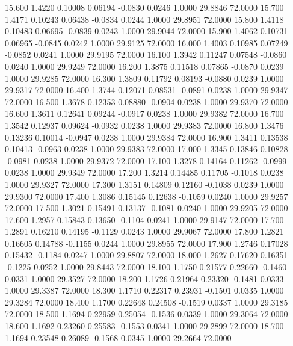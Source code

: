   15.600   1.4220   0.10008   0.06194  -0.0830   0.0246   1.0000  29.8846  72.0000
  15.700   1.4171   0.10243   0.06438  -0.0834   0.0244   1.0000  29.8951  72.0000
  15.800   1.4118   0.10483   0.06695  -0.0839   0.0243   1.0000  29.9044  72.0000
  15.900   1.4062   0.10731   0.06965  -0.0845   0.0242   1.0000  29.9125  72.0000
  16.000   1.4003   0.10985   0.07249  -0.0852   0.0241   1.0000  29.9195  72.0000
  16.100   1.3942   0.11247   0.07548  -0.0860   0.0240   1.0000  29.9249  72.0000
  16.200   1.3875   0.11518   0.07865  -0.0870   0.0239   1.0000  29.9285  72.0000
  16.300   1.3809   0.11792   0.08193  -0.0880   0.0239   1.0000  29.9317  72.0000
  16.400   1.3744   0.12071   0.08531  -0.0891   0.0238   1.0000  29.9347  72.0000
  16.500   1.3678   0.12353   0.08880  -0.0904   0.0238   1.0000  29.9370  72.0000
  16.600   1.3611   0.12641   0.09244  -0.0917   0.0238   1.0000  29.9382  72.0000
  16.700   1.3542   0.12937   0.09624  -0.0932   0.0238   1.0000  29.9383  72.0000
  16.800   1.3476   0.13236   0.10014  -0.0947   0.0238   1.0000  29.9384  72.0000
  16.900   1.3411   0.13538   0.10413  -0.0963   0.0238   1.0000  29.9383  72.0000
  17.000   1.3345   0.13846   0.10828  -0.0981   0.0238   1.0000  29.9372  72.0000
  17.100   1.3278   0.14164   0.11262  -0.0999   0.0238   1.0000  29.9349  72.0000
  17.200   1.3214   0.14485   0.11705  -0.1018   0.0238   1.0000  29.9327  72.0000
  17.300   1.3151   0.14809   0.12160  -0.1038   0.0239   1.0000  29.9300  72.0000
  17.400   1.3086   0.15145   0.12638  -0.1059   0.0240   1.0000  29.9257  72.0000
  17.500   1.3021   0.15491   0.13137  -0.1081   0.0240   1.0000  29.9205  72.0000
  17.600   1.2957   0.15843   0.13650  -0.1104   0.0241   1.0000  29.9147  72.0000
  17.700   1.2891   0.16210   0.14195  -0.1129   0.0243   1.0000  29.9067  72.0000
  17.800   1.2821   0.16605   0.14788  -0.1155   0.0244   1.0000  29.8955  72.0000
  17.900   1.2746   0.17028   0.15432  -0.1184   0.0247   1.0000  29.8807  72.0000
  18.000   1.2627   0.17620   0.16351  -0.1225   0.0252   1.0000  29.8443  72.0000
  18.100   1.1750   0.21577   0.22660  -0.1460   0.0331   1.0000  29.3527  72.0000
  18.200   1.1726   0.21964   0.23320  -0.1481   0.0333   1.0000  29.3387  72.0000
  18.300   1.1710   0.22317   0.23931  -0.1501   0.0335   1.0000  29.3284  72.0000
  18.400   1.1700   0.22648   0.24508  -0.1519   0.0337   1.0000  29.3185  72.0000
  18.500   1.1694   0.22959   0.25054  -0.1536   0.0339   1.0000  29.3064  72.0000
  18.600   1.1692   0.23260   0.25583  -0.1553   0.0341   1.0000  29.2899  72.0000
  18.700   1.1694   0.23548   0.26089  -0.1568   0.0345   1.0000  29.2664  72.0000
